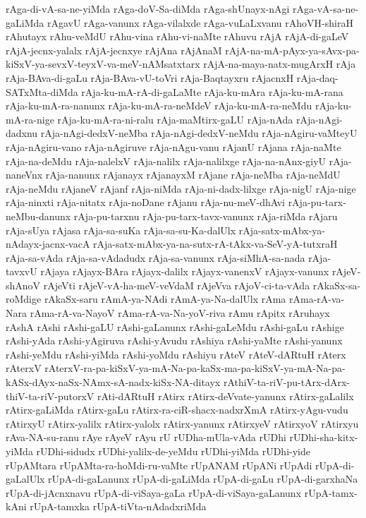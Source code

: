 {rAga-di-vA-sa-ne-yiMda
rAga-doV-Sa-diMda
rAga-shUnayx-nAgi
rAga-vA-sa-ne-gaLiMda
rAgavU
rAga-vanunx
rAga-vilalxde
rAga-vuLaLxvanu
rAhoVH-shiraH
rAhutayx
rAhu-veMdU
rAhu-vina
rAhu-vi-naMte
rAhuvu
rAjA
rAjA-di-gaLeV
rAjA-jecnx-yalalx
rAjA-jecnxye
rAjAna
rAjAnaM
rAjA-na-mA-pAyx-ya-sAvx-pa-kiSxV-ya-sevxV-teyxV-va-meV-nAMsatxtarx
rAjA-na-maya-natx-mugArxH
rAja
rAja-BAva-di-gaLu
rAja-BAva-vU-toVri
rAja-Baqtayxru
rAjacnxH
rAja-daq-SATxMta-diMda
rAja-ku-mA-rA-di-gaLaMte
rAja-ku-mAra
rAja-ku-mA-rana
rAja-ku-mA-ra-nanunx
rAja-ku-mA-ra-neMdeV
rAja-ku-mA-ra-neMdu
rAja-ku-mA-ra-nige
rAja-ku-mA-ra-ni-ralu
rAja-maMtirx-gaLU
rAja-nAda
rAja-nAgi-dadxnu
rAja-nAgi-dedxV-neMba
rAja-nAgi-dedxV-neMdu
rAja-nAgiru-vaMteyU
rAja-nAgiru-vano
rAja-nAgiruve
rAja-nAgu-vanu
rAjanU
rAjana
rAja-naMte
rAja-na-deMdu
rAja-nalelxV
rAja-nalilx
rAja-nalilxge
rAja-na-nAnx-giyU
rAja-naneVnx
rAja-nanunx
rAjanayx
rAjanayxM
rAjane
rAja-neMba
rAja-neMdU
rAja-neMdu
rAjaneV
rAjanf
rAja-niMda
rAja-ni-dadx-lilxge
rAja-nigU
rAja-nige
rAja-ninxti
rAja-nitatx
rAja-noDane
rAjanu
rAja-nu-meV-dhAvi
rAja-pu-tarx-neMbu-danunx
rAja-pu-tarxnu
rAja-pu-tarx-tavx-vanunx
rAja-riMda
rAjaru
rAja-sUya
rAjasa
rAja-sa-suKa
rAja-sa-su-Ka-dalUlx
rAja-satx-mAbx-ya-nAdayx-jacnx-vacA
rAja-satx-mAbx-ya-na-sutx-rA-tAkx-va-SeV-yA-tutxraH
rAja-sa-vAda
rAja-sa-vAdadudx
rAja-sa-vanunx
rAja-siMhA-sa-nada
rAja-tavxvU
rAjaya
rAjayx-BAra
rAjayx-dalilx
rAjayx-vanenxV
rAjayx-vanunx
rAjeV-shAnoV
rAjeVti
rAjeV-vA-ha-meV-veVdaM
rAjeVva
rAjoV-ci-ta-vAda
rAkaSx-sa-roMdige
rAkaSx-saru
rAmA-ya-NAdi
rAmA-ya-Na-dalUlx
rAma
rAma-rA-va-Nara
rAma-rA-va-NayoV
rAma-rA-va-Na-yoV-riva
rAmu
rApitx
rAruhayx
rAshA
rAshi
rAshi-gaLU
rAshi-gaLanunx
rAshi-gaLeMdu
rAshi-gaLu
rAshige
rAshi-yAda
rAshi-yAgiruva
rAshi-yAvudu
rAshiya
rAshi-yaMte
rAshi-yanunx
rAshi-yeMdu
rAshi-yiMda
rAshi-yoMdu
rAshiyu
rAteV
rAteV-dARtuH
rAterx
rAterxV
rAterxV-ra-pa-kiSxV-ya-mA-Na-pa-kaSx-ma-pa-kiSxV-ya-mA-Na-pa-kASx-dAyx-naSx-NAmx-sA-nadx-kiSx-NA-ditayx
rAthiV-ta-riV-pu-tArx-dArx-thiV-ta-riV-putorxV
rAti-dARtuH
rAtirx
rAtirx-deVvate-yanunx
rAtirx-gaLalilx
rAtirx-gaLiMda
rAtirx-gaLu
rAtirx-ra-ciR-shacx-nadxrXmA
rAtirx-yAgu-vudu
rAtirxyU
rAtirx-yalilx
rAtirx-yalolx
rAtirx-yanunx
rAtirxyeV
rAtirxyoV
rAtirxyu
rAva-NA-su-ranu
rAye
rAyeV
rAyu
rU
rUDha-mUla-vAda
rUDhi
rUDhi-sha-kitx-yiMda
rUDhi-sidudx
rUDhi-yalilx-de-yeMdu
rUDhi-yiMda
rUDhi-yide
rUpAMtara
rUpAMta-ra-hoMdi-ru-vaMte
rUpANAM
rUpANi
rUpAdi
rUpA-di-gaLalUlx
rUpA-di-gaLanunx
rUpA-di-gaLiMda
rUpA-di-gaLu
rUpA-di-garxhaNa
rUpA-di-jAcnxnavu
rUpA-di-viSaya-gaLa
rUpA-di-viSaya-gaLanunx
rUpA-tamx-kAni
rUpA-tamxka
rUpA-tiVta-nAdadxriMda
}
